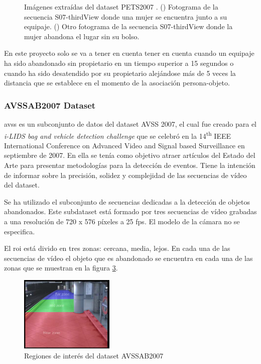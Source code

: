 \begin{figure}[ht]
\begin{subfigure}[b]{0.4\textwidth}
    \caption{}
    \label{fig:pets2007_4}
  \end{subfigure}
  \caption{Imágenes extraídas del dataset PETS2007 \cite{pets2007-dataset}.
    (\protect{}) Fotograma de la secuencia S07-thirdView donde una mujer se encuentra junto a su equipaje.
    (\protect{}) Otro fotograma de la secuencia S07-thirdView donde la mujer abandona el lugar sin su bolso.}
  \label{fig:pets2007_S07}
\end{figure}

En este proyecto solo se va a tener en cuenta tener en cuenta cuando un equipaje ha sido abandonado sin propietario en un tiempo superior a 15 segundos o cuando ha sido desatendido por su propietario alejándose más de 5 veces la distancia que se establece en el momento de la asociación persona-objeto.

\subsubsection{AVSSAB2007 Dataset}

\gls{avss} \cite{AVSSAB2007-dataset} es un subconjunto de datos del dataset AVSS 2007, el cual fue creado para el \textit{i-LIDS bag and vehicle detection challenge} que se celebró en la 14\textsuperscript{th} IEEE International Conference on Advanced Video and Signal based Surveillance en septiembre de 2007. En ella se tenía como objetivo atraer artículos del Estado del Arte para presentar metodologías para la detección de eventos. Tiene la intención de informar sobre la precisión, solidez y complejidad de las secuencias de vídeo del dataset.

Se ha utilizado el subconjunto de secuencias dedicadas a la detección de objetos abandonados. Este subdataset está formado por tres secuencias de vídeo grabadas a una resolución de 720 x 576 píxeles a 25 \gls{fps}. El modelo de la cámara no se especifica.

El \gls{roi} está divido en tres zonas: cercana, media, lejos. En cada una de las secuencias de vídeo el objeto que es abandonado se encuentra en cada una de las zonas que se muestran en la figura \ref{fig:avssab2007-zones}.

\begin{figure}[ht]
\centering
\includegraphics[width=0.4\textwidth]{img/chapters/resultados/datasets/avssab2007-zones.png}
\caption{\label{fig:avssab2007-zones}Regiones de interés del dataset AVSSAB2007 \cite{AVSSAB2007-dataset}}
\end{figure}

